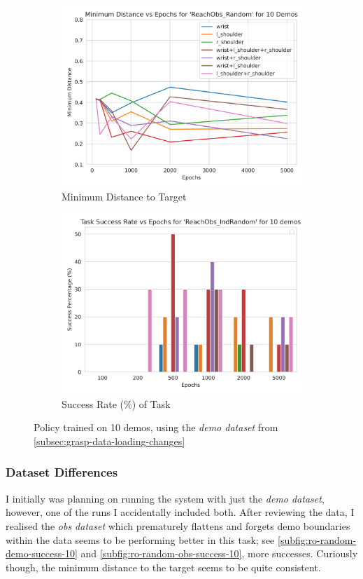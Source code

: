 \begin{figure}[htpb] %
  \centering
  \begin{subfigure}{0.45\linewidth}
    \centering
    \includegraphics[width=0.6\linewidth]{assets/cam-comb/reach-obs/ro_indrandom-obs-mindist-10demos.png}
    \caption{Minimum Distance to Target}\label{subfig:ro-indrandom-demo-mindist-10}
  \end{subfigure}
  \begin{subfigure}{0.45\linewidth}
    \centering
    \includegraphics[width=0.6\linewidth]{assets/cam-comb/reach-obs/ro_indrandom-demo-success-10demos.png}
    \caption{Success Rate (\%) of Task}\label{subfig:ro-indrandom-demo-success-10}
  \end{subfigure}
  \caption{Policy trained on 10 demos, using the \emph{demo dataset} from \ref{subsec:grasp-data-loading-changes}}\label{fig:ro-indrandom-demo-cams}
\end{figure}

\subsubsection{Dataset Differences}
I initially was planning on running the system with just the \emph{demo dataset}, however, one of the runs I accidentally included both. After reviewing the data, I realised the \emph{obs dataset} which prematurely flattens and forgets demo boundaries within the data seems to be performing better in this task; see \ref{subfig:ro-random-demo-success-10} and \ref{subfig:ro-random-obs-success-10}, more successes. Curiously though, the minimum distance to the target seems to be quite consistent.

